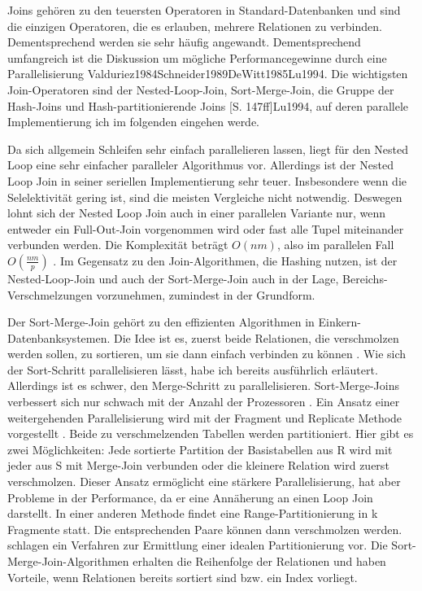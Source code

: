 \documentclass[a4paper,12pt,twoside]{article}
\begin{document}
Joins gehören zu den teuersten Operatoren in Standard-Datenbanken und sind die einzigen Operatoren, die es erlauben, mehrere Relationen zu verbinden. Dementsprechend werden sie sehr häufig angewandt. Dementsprechend umfangreich ist die Diskussion um mögliche Performancegewinne durch eine Parallelisierung {\autocite{Richardson1987}{Valduriez1984}{Schneider1989}{DeWitt1985}{Lu1994}}. Die wichtigsten Join-Operatoren sind der Nested-Loop-Join, Sort-Merge-Join, die Gruppe der Hash-Joins und Hash-partitionierende Joins {\autocite{Mishra1992}[S. 147ff]{Lu1994}}, auf deren parallele Implementierung ich im folgenden eingehen werde.

Da sich allgemein Schleifen sehr einfach parallelieren lassen, liegt für den Nested Loop eine sehr einfacher paralleler Algorithmus vor. Allerdings ist der Nested Loop Join in seiner seriellen Implementierung sehr teuer. Insbesondere wenn die Selelektivität gering ist, sind die meisten Vergleiche nicht notwendig. Deswegen lohnt sich der Nested Loop Join auch in einer parallelen Variante nur, wenn entweder ein Full-Out-Join vorgenommen wird oder fast alle Tupel miteinander verbunden werden. Die Komplexität beträgt $ O(n m) $, also im parallelen Fall $ O( \frac {n m} {p} )$ {\autocite[S. 72]{Mishra1992}}. Im Gegensatz zu den Join-Algorithmen, die Hashing nutzen, ist der Nested-Loop-Join und auch der Sort-Merge-Join auch in der Lage, Bereichs-Verschmelzungen vorzunehmen, zumindest in der Grundform. 

Der Sort-Merge-Join gehört zu den effizienten Algorithmen in Einkern-Datenbanksystemen. Die Idee ist es, zuerst beide Relationen, die verschmolzen werden sollen, zu sortieren, um sie dann einfach verbinden zu können {\autocite[S. 149]{Lu1994}}. Wie sich der Sort-Schritt parallelisieren lässt, habe ich bereits ausführlich erläutert. Allerdings ist es schwer, den Merge-Schritt zu parallelisieren. Sort-Merge-Joins verbessert sich nur schwach mit der Anzahl der Prozessoren {\autocite{Yu1998}}. Ein Ansatz einer weitergehenden Parallelisierung wird mit der Fragment und Replicate Methode vorgestellt {\autocite {Richardson1987}}.  Beide zu verschmelzenden Tabellen werden partitioniert. Hier gibt es zwei Möglichkeiten: Jede sortierte Partition der Basistabellen aus R wird mit jeder aus S mit Merge-Join verbunden oder die kleinere Relation wird zuerst verschmolzen. Dieser Ansatz ermöglicht eine stärkere Parallelisierung, hat aber Probleme in der Performance, da er eine Annäherung an einen Loop Join darstellt. In einer anderen Methode findet eine Range-Partitionierung in k Fragmente statt. Die entsprechenden Paare können dann verschmolzen werden. \textcite{Iyer1989} schlagen ein Verfahren zur Ermittlung einer idealen Partitionierung vor. Die Sort-Merge-Join-Algorithmen erhalten die Reihenfolge der Relationen und haben Vorteile, wenn Relationen bereits sortiert sind bzw. ein Index vorliegt.
\end{document}
